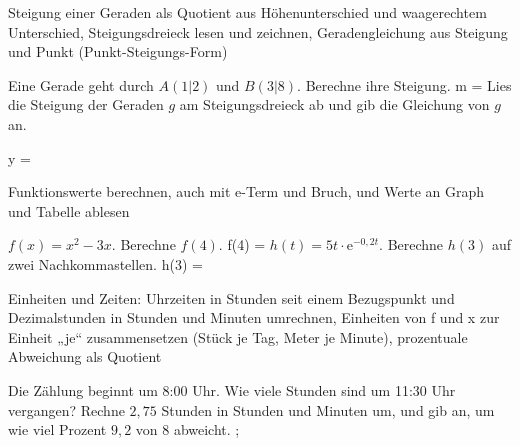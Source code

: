 \setcounter{aufgabe}{0}

\begin{aufgabe}{Steigung einer Geraden als Quotient aus Höhenunterschied und waagerechtem Unterschied, Steigungsdreieck lesen und zeichnen, Geradengleichung aus Steigung und Punkt (Punkt-Steigungs-Form)}
\begin{teile}
\teil Eine Gerade geht durch $A(1 | 2)$ und $B(3 | 8)$. Berechne ihre Steigung. m = \leerfeld
\teil Lies die Steigung der Geraden $g$ am Steigungsdreieck ab und gib die Gleichung von $g$ an.

\begin{ksys}[xmin=-2,xmax=4,ymin=-3,ymax=7,ablesen]\end{ksys}
y = \leerfeld
\end{teile}
\end{aufgabe}

\begin{aufgabe}{Funktionswerte berechnen, auch mit e-Term und Bruch, und Werte an Graph und Tabelle ablesen}
\begin{teile}
\teil $f(x) = x^2 - 3x$. Berechne $f(4)$. f(4) = \leerfeld
\teil $h(t) = 5t \cdot \mathrm{e}^{-0{,}2t}$. Berechne $h(3)$ auf zwei Nachkommastellen. h(3) = \leerfeld
\end{teile}
\end{aufgabe}

\begin{aufgabe}{Einheiten und Zeiten: Uhrzeiten in Stunden seit einem Bezugspunkt und Dezimalstunden in Stunden und Minuten umrechnen, Einheiten von f und x zur Einheit „je“ zusammensetzen (Stück je Tag, Meter je Minute), prozentuale Abweichung als Quotient}
\begin{teile}
\teil Die Zählung beginnt um 8:00 Uhr. Wie viele Stunden sind um 11:30 Uhr vergangen? \leerfeld[h]
\teil Rechne $2{,}75$ Stunden in Stunden und Minuten um, und gib an, um wie viel Prozent $9{,}2$ von $8$ abweicht. \leerfeld[h] \leerfeld[min] ; \leerfeld[\%]
\end{teile}
\end{aufgabe}

